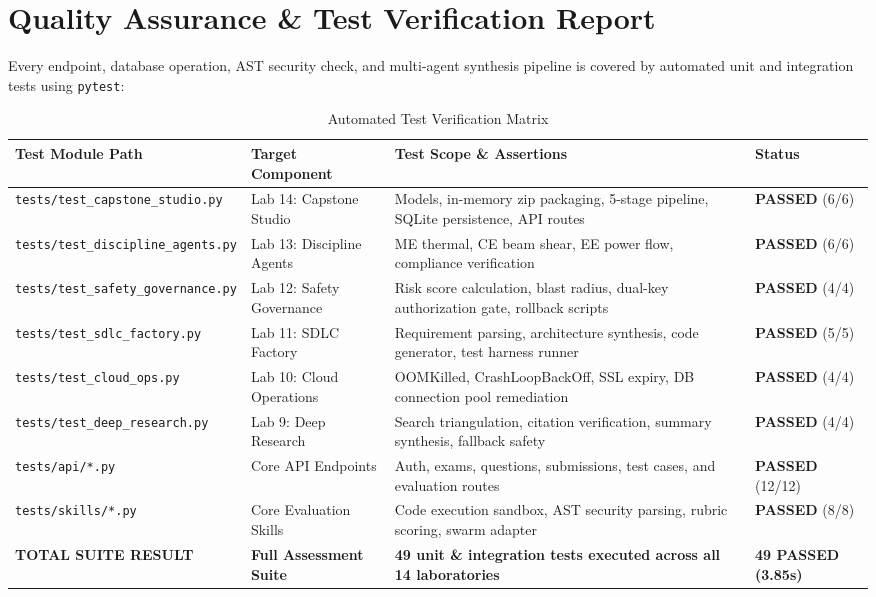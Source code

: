 \documentclass[12pt, a4paper]{report}
\begin{document}
\chapter{Quality Assurance \& Test Verification Report}

Every endpoint, database operation, AST security check, and multi-agent synthesis pipeline is covered by automated unit and integration tests using \texttt{pytest}:

\begin{table}[H]
\centering
\caption{Automated Test Verification Matrix}
\renewcommand{\arraystretch}{1.2}
\small
\begin{tabular}{|L{4.5cm}|L{3.2cm}|L{6.0cm}|C{2.3cm}|}
\hline
{}
\color{white}\textbf{Test Module Path} & \color{white}\textbf{Target Component} & \color{white}\textbf{Test Scope \& Assertions} & \color{white}\textbf{Status} \\
\hline
\texttt{tests/test\_capstone\_studio.py} & Lab 14: Capstone Studio & Models, in-memory zip packaging, 5-stage pipeline, SQLite persistence, API routes & \textbf{PASSED} (6/6) \\
\hline
{}
\texttt{tests/test\_discipline\_agents.py} & Lab 13: Discipline Agents & ME thermal, CE beam shear, EE power flow, compliance verification & \textbf{PASSED} (6/6) \\
\hline
\texttt{tests/test\_safety\_governance.py} & Lab 12: Safety Governance & Risk score calculation, blast radius, dual-key authorization gate, rollback scripts & \textbf{PASSED} (4/4) \\
\hline
{}
\texttt{tests/test\_sdlc\_factory.py} & Lab 11: SDLC Factory & Requirement parsing, architecture synthesis, code generator, test harness runner & \textbf{PASSED} (5/5) \\
\hline
\texttt{tests/test\_cloud\_ops.py} & Lab 10: Cloud Operations & OOMKilled, CrashLoopBackOff, SSL expiry, DB connection pool remediation & \textbf{PASSED} (4/4) \\
\hline
{}
\texttt{tests/test\_deep\_research.py} & Lab 9: Deep Research & Search triangulation, citation verification, summary synthesis, fallback safety & \textbf{PASSED} (4/4) \\
\hline
\texttt{tests/api/*.py} & Core API Endpoints & Auth, exams, questions, submissions, test cases, and evaluation routes & \textbf{PASSED} (12/12) \\
\hline
{}
\texttt{tests/skills/*.py} & Core Evaluation Skills & Code execution sandbox, AST security parsing, rubric scoring, swarm adapter & \textbf{PASSED} (8/8) \\
\hline
{}
\textbf{TOTAL SUITE RESULT} & \textbf{Full Assessment Suite} & \textbf{49 unit \& integration tests executed across all 14 laboratories} & \textbf{\color{successgreen}49 PASSED (3.85s)} \\
\hline
\end{tabular}
\end{table}
\end{document}

